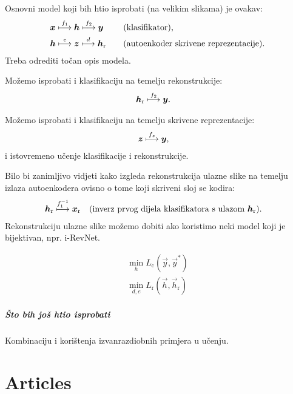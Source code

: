 \documentclass[oneside]{book}
\begin{document}
Osnovni model koji bih htio isprobati (na velikim slikama) je ovakav:
\begin{alignat}{3}
    &\vec x \overset{f_1}{\longmapsto} \vec h \overset{f_2}{\longmapsto} \vec y 
    \quad&&\text{(klasifikator)} \text, \\
    &\vec h \overset{e}{\longmapsto} \vec z \overset{d}{\longmapsto} \vec h_\text{r}
    \quad&&\text{(autoenkoder skrivene reprezentacije)} \text.
\end{alignat}
Treba odrediti točan opis modela.

Možemo isprobati i klasifikaciju na temelju rekonstrukcije:
\begin{align}
    &\vec h_\text{r} \overset{f_2}{\longmapsto} \vec y\text.
\end{align}

Možemo isprobati i klasifikaciju na temelju skrivene reprezentacije:
\begin{align}
    &\vec z \overset{f_z}{\longmapsto} \vec y \text,
\end{align}
i istovremeno učenje klasifikacije i rekonstrukcije.

Bilo bi zanimljivo vidjeti kako izgleda rekonstrukcija ulazne slike na temelju izlaza autoenkodera ovisno o tome koji skriveni sloj se kodira:
\begin{align}
    &\vec h_\text{r} \overset{f_1^{-1}}{\longmapsto} \vec x_\text{r}
    \quad \text{(inverz prvog dijela klasifikatora s ulazom $\vec h_\text{r}$)} \text.
\end{align}
Rekonstrukciju ulazne slike možemo dobiti ako koristimo neki model koji je bijektivan, npr. i-RevNet.


\begin{align}
    \min_{h} L_\text{c}(\vec y, \vec y^*) \\
    \min_{d, e} L_\text{r}(\vec h,\vec h_\text{r})
\end{align}

\subsubsection{Što bih još htio isprobati}

Kombinaciju \cite{Lee:2017:TCCCDOOD} i korištenja izvanrazdiobnih primjera u učenju.







\part{Articles}
\end{document}
